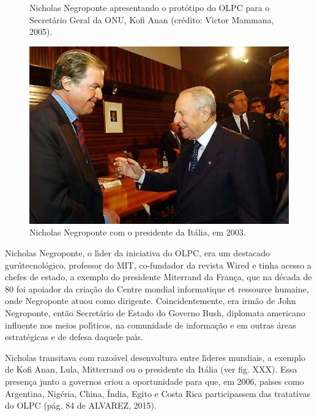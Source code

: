 \documentclass[
12pt,		%
openright,	%
twoside,  %
a4paper,			%
chapter=TITLE,		%
english,			%
french,				%
spanish,			%
brazil				%
]{USPSC-classe/USPSC}
\begin{document}
\begin{figure}[max size={\textwidth}{\textheight}]
\begin{minipage}[b]{0.4\linewidth}
                \caption{Nicholas Negroponte apresentando o prot\'otipo do OLPC para o Secret\'ario Geral da ONU, Kofi Anan (cr\'edito: Victor Mammana, 2005).}
                \label{31f6206a8e4662597d5a134974d64a4696f4129c}
\end{minipage}
\hspace{0.5cm}
\begin{minipage}[b]{0.4\linewidth}
        \centering
                \includegraphics[width=1.0\linewidth]{../../imagens/presidente-italia.jpg}
                \caption{Nicholas Negroponte com o presidente da It\'alia, em 2003.}
                \label{f15f5d2fa7b78d2e6dec6ac4a7be76d564c9bf71}
\end{minipage}%
\hspace{0.5cm}
\end{figure}



Nicholas Negroponte, o l\'{\i}der da iniciativa do OLPC, era um destacado \textquotedbl gur\'u\textquotedbl  tecnol\'ogico, professor do MIT, co-fundador da revista Wired e tinha acesso a chefes de estado, a exemplo do presidente Miterrand da Fran\c{c}a, que na d\'ecada de 80 foi apoiador da cria\c{c}\~ao do \textquotedbl Centre mondial informatique et ressource humaine\textquotedbl , onde Negroponte atuou como dirigente. Coincidentemente, era irm\~ao de John Negroponte, ent\~ao Secret\'ario de Estado do Governo Bush, diplomata americano influente nos meios pol\'{\i}ticos, na comunidade de informa\c{c}\~ao e em outras \'areas estrat\'egicas e de defesa daquele pa\'{\i}s.




Nicholas transitava com razo\'avel desenvoltura entre l\'{\i}deres mundiais, a exemplo de Kofi Anan, Lula, Mitterrand ou o presidente da It\'alia (ver fig. XXX). Essa presen\c{c}a junto a governos criou a oportunidade para que, em 2006, pa\'{\i}ses como Argentina, Nig\'eria, China, \'India, Egito e Costa Rica participassem das tratativas do OLPC  (p\'ag. 84 de ALVAREZ, 2015).
\end{document}
